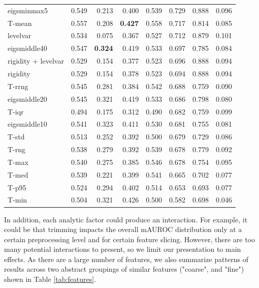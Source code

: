 \documentclass[12pt]{spieman}  %
\begin{document}
\begin{spacing}{2}
\begin{table}[h!]
\begin{tabular}{lrrrrrrr}
eigsminmax5                    &  0.549 &  0.213 &  0.400 &  0.539 &  0.729 &  0.888 &  0.096 \\
T-mean                         &  0.557 &  0.208 &  \textbf{0.427} &  0.558 &  0.717 &  0.814 &  0.085 \\
levelvar                       &  0.534 &  0.075 &  0.367 &  0.527 &  0.712 &  0.879 &  0.101 \\
eigsmiddle40                   &  0.547 &  \textbf{0.324} &  0.419 &  0.533 &  0.697 &  0.785 &  0.084 \\
rigidity + levelvar            &  0.529 &  0.154 &  0.377 &  0.523 &  0.696 &  0.888 &  0.094 \\
rigidity                       &  0.529 &  0.154 &  0.378 &  0.523 &  0.694 &  0.888 &  0.094 \\
T-rrng                         &  0.545 &  0.281 &  0.384 &  0.542 &  0.688 &  0.759 &  0.090 \\
eigsmiddle20                   &  0.545 &  0.321 &  0.419 &  0.533 &  0.686 &  0.798 &  0.080 \\
T-iqr                          &  0.494 &  0.175 &  0.312 &  0.490 &  0.682 &  0.759 &  0.099 \\
eigsmiddle10                   &  0.541 &  0.323 &  0.411 &  0.530 &  0.681 &  0.755 &  0.081 \\
T-std                          &  0.513 &  0.252 &  0.392 &  0.500 &  0.679 &  0.729 &  0.086 \\
T-rng                          &  0.538 &  0.279 &  0.392 &  0.539 &  0.678 &  0.779 &  0.092 \\
T-max                          &  0.540 &  0.275 &  0.385 &  0.546 &  0.678 &  0.754 &  0.095 \\
T-med                          &  0.539 &  0.221 &  0.399 &  0.541 &  0.665 &  0.702 &  0.077 \\
T-p95                          &  0.524 &  0.294 &  0.402 &  0.514 &  0.653 &  0.693 &  0.077 \\
T-min                          &  0.504 &  0.321 &  0.426 &  0.500 &  0.582 &  0.698 &  0.046 \\
\hline
\end{tabular}
\end{table}

In addition, each analytic factor could produce an interaction. For example, it
could be that trimming impacts the overall mAUROC distribution only at a
certain preprocessing level and for certain feature slicing. However, there are
too many potential interactions to present, so we limit our presentation to
main effects.  As there are a large number of features, we also summarize
patterns of results across two abstract groupings of similar features
("coarse", and "fine") shown in Table \ref{tab:features}.


\end{spacing}
\end{document}
